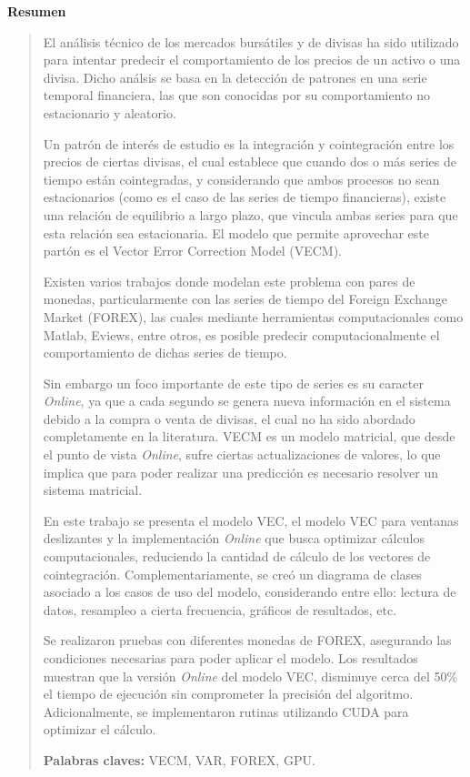 \newpage

\vspace*{2cm}
\thispagestyle{empty}
{\bfseries \Huge Resumen }
\vspace{1.5cm}

\begin{quotation}
El análisis técnico de los mercados bursátiles y de divisas ha sido utilizado
para intentar predecir el comportamiento de los precios de un activo o una
divisa. Dicho análsis se basa en la detección de patrones en una serie temporal
financiera, las que son conocidas por su comportamiento no estacionario y
aleatorio. 


Un patrón de interés de estudio es la integración y cointegración entre los
precios de ciertas divisas, el cual establece que cuando dos o más series de
tiempo están cointegradas, y considerando que ambos procesos no sean
estacionarios (como es el caso de las series de tiempo financieras), existe una
relación de equilibrio a largo plazo, que vincula ambas series para que esta
relación sea estacionaria. El modelo que permite aprovechar este partón es el
Vector Error Correction Model (VECM).

Existen varios trabajos donde modelan este problema con pares de monedas,
particularmente con las series de tiempo del Foreign Exchange Market (FOREX),
las cuales mediante herramientas computacionales como Matlab, Eviews, entre
otros, es posible predecir computacionalmente el comportamiento de dichas
series de tiempo.

Sin embargo un foco importante de este tipo de series es su caracter
\emph{Online}, ya que a cada segundo se genera nueva información en el sistema
debido a la compra o venta de divisas, el cual no ha sido abordado
completamente en la literatura.  VECM es un modelo matricial, que desde el
punto de vista \emph{Online}, sufre ciertas actualizaciones de valores, lo que
implica que para poder realizar una predicción es necesario resolver un sistema
matricial.

En este trabajo se presenta el modelo VEC, el modelo VEC para ventanas
deslizantes y la implementación \emph{Online} que busca optimizar cálculos
computacionales, reduciendo la cantidad de cálculo de los vectores de
cointegración.  Complementariamente, se creó un diagrama de clases asociado a
los casos de uso del modelo, considerando entre ello: lectura de datos,
resampleo a cierta frecuencia, gráficos de resultados, etc.

Se realizaron pruebas con diferentes monedas de FOREX, asegurando las
condiciones necesarias para poder aplicar el modelo. Los resultados muestran
que la versión \emph{Online} del modelo VEC, disminuye cerca del 50\% el tiempo
de ejecución sin comprometer la precisión del algoritmo. Adicionalmente, se
implementaron rutinas utilizando CUDA para optimizar el cálculo.

{\bf Palabras claves:} VECM, VAR, FOREX, GPU.

\end{quotation}
